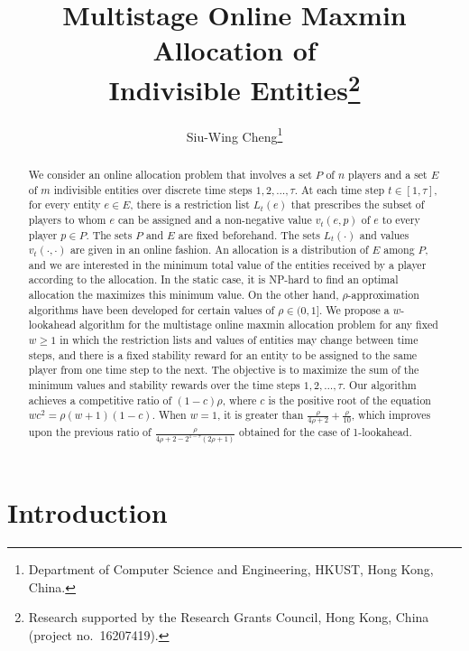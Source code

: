 \documentclass[11pt,a4paper]{article}
\renewcommand{\geq}{\geqslant}
\begin{document}
	\title{Multistage Online Maxmin Allocation of \\ Indivisible Entities\thanks{Research supported by the
			Research Grants Council, Hong Kong, China (project no.~16207419).}}
	\author{Siu-Wing Cheng\footnote{Department of Computer Science and Engineering,
			HKUST, Hong Kong, China.}}
	
	\date{}
	
	\maketitle
	
	\begin{abstract}
	We consider an online allocation problem that involves a set $P$ of $n$ players and a set $E$ of $m$ indivisible entities over discrete time steps $1,2,\ldots,\tau$.  At each time step $t \in [1,\tau]$, for every entity $e \in E$, there is a restriction list $L_t(e)$ that prescribes the subset of players to whom $e$ can be assigned and a non-negative value $v_t(e,p)$ of $e$ to every player $p \in P$.  The sets $P$ and $E$ are fixed beforehand.  The sets $L_t(\cdot)$ and values $v_t(\cdot,\cdot)$ are given in an online fashion.   An allocation is a distribution of $E$ among $P$, and we are interested in the minimum total value of  the entities received by a player according to the allocation. In the static case, it is NP-hard to find an optimal allocation the maximizes this minimum value.  On the other hand, $\rho$-approximation algorithms have been developed for certain values of $\rho \in (0,1]$.  We propose a $w$-lookahead algorithm for the multistage online maxmin allocation problem for any fixed $w \geq 1$ in which the restriction lists and values of entities may change between time steps, and there is a fixed stability reward for an entity to be assigned to the same player from one time step to the next.  The objective is to maximize the sum of the minimum values and stability rewards over the time steps $1, 2, \ldots, \tau$.  Our algorithm achieves a competitive  ratio  of $(1-c)\rho$, where $c$ is the positive root of the equation $wc^2 = \rho (w+1)(1-c)$.  When $w = 1$, it is greater than $\frac{\rho}{4\rho+2} + \frac{\rho}{10}$, which improves upon the previous ratio of $\frac{\rho}{4\rho+2 - 2^{1-\tau}(2\rho+1)}$ obtained for the case of 1-lookahead.  
\end{abstract}

\section{Introduction}
\end{document}
